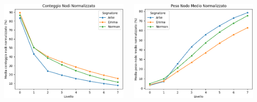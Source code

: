 \begin{minipage}[t]{\textwidth}
    \begin{columns}
    \begin{column}{0.45\textwidth}
        \includegraphics[width=\textwidth]{immagini/conteggio_nodi_normalizzato}
    \end{column}
    \begin{column}{0.45\textwidth}
        \includegraphics[width=\textwidth]{immagini/peso_nodo_medio_normalizzato}
    \end{column}
        \end{columns}
    \end{minipage}
